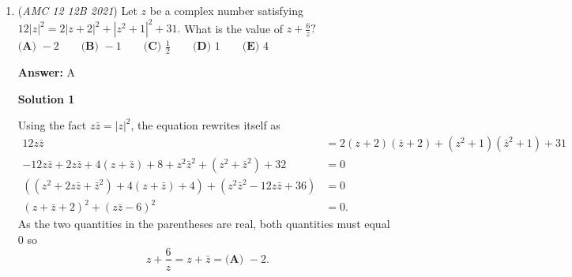 \begin{enumerate}
 Let $X$ and $Y$ be the feet of the perpendiculars from $P$ to $AB$ and $CD$, respectively. Observe that $PX = \frac 8r$ and $PY = \frac 4s$. Now using the formula for the area of a trapezoid yields
 \[14 = \frac12\cdot XY\cdot (AB+CD) = \frac12\left(\frac 8r + \frac 4s\right)(r+s) = 6 + 2\cdot\frac rs + 4\cdot\frac sr.\]Thus, the ratio $\rho := \frac rs$ satisfies $\rho + 2\rho^{-1} = 4$; solving yields $\rho = \boxed{\textbf{(B)}\: 2+\sqrt{2}}$.

 (Observe that the given areas of $3$ and $5$ are irrelevant to the ratio $\frac{AB}{CD}$.)

 



\textbf{Solution 2}

Let $b_1$ be the bottom base, $b_2$ be the top base, $h_1$ be the height of the bottom triangle, $h_2$ be the height of the top triangle.Thus, $b_1h_1 = 8, b_2h_2 = 4, (b_1+b_2)(h_1+h_2) = 28,$ so $b_1h_2 + b_2h_1 = 16.$ Let $b_2 = 1, h_2 = 4,$ so we get $b_1h_1 = 8, 4b_1+h_1 = 16.$This gives us a quadratic in $b_1,$ ie. $4b_1^2+8=16b_1,$ so $b_1 = \boxed{\textbf{(B)}\: 2+\sqrt{2}}.$

 - Solution by MathAwesome123, added by ccx09

 


 


	\item (\textit{AMC 12 12B 2021}) Let $z$ be a complex number satisfying $12|z|^2=2|z+2|^2+|z^2+1|^2+31.$ What is the value of $z+\frac 6z?$
$\textbf{(A) }-2 \qquad \textbf{(B) }-1 \qquad \textbf{(C) }\frac12\qquad \textbf{(D) }1 \qquad \textbf{(E) }4$

 \textbf{Answer: }A



\textbf{Solution 1}

Using the fact $z\bar{z}=|z|^2$, the equation rewrites itself as
 \begin{align*} 12z\bar{z}&=2(z+2)(\bar{z}+2)+(z^2+1)(\bar{z}^2+1)+31 \\ -12z\bar{z}+2z\bar{z}+4(z+\bar{z})+8+z^2\bar{z}^2+(z^2+\bar{z}^2)+32&=0 \\ \left((z^2+2z\bar{z}+\bar{z}^2)+4(z+\bar{z})+4\right)+\left(z^2\bar{z}^2-12z\bar{z}+36\right)&=0 \\ (z+\bar{z}+2)^2+(z\bar{z}-6)^2&=0. \end{align*}
As the two quantities in the parentheses are real, both quantities must equal $0$ so 
 \[z+\frac6z=z+\bar{z}=\boxed{\textbf{(A) }-2}.\]





\end{enumerate}
